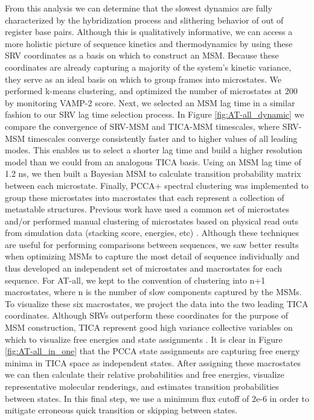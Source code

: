 \documentclass[journal=jpcbfk,manuscript=article]{achemso}
\begin{document}
From this analysis we can determine that the slowest dynamics are fully characterized by the hybridization process and slithering behavior of out of register base pairs. Although this is qualitatively informative, we can access a more holistic picture of sequence kinetics and thermodynamics by using these SRV coordinates as a basis on which to construct an MSM. Because these coordinates are already capturing a majority of the system's kinetic variance, they serve as an ideal basis on which to group frames into microstates. We performed k-means clustering, and optimized the number of microstates at 200 by monitoring VAMP-2 score. Next, we selected an MSM lag time in a similar fashion to our SRV lag time selection process. In Figure \ref{fig:AT-all_dynamic} we compare the convergence of SRV-MSM and TICA-MSM timescales, where SRV-MSM timescales converge consistently faster and to higher values of all leading modes. This enables us to select a shorter lag time and build a higher resolution model than we could from an analogous TICA basis. Using an MSM lag time of 1.2 ns, we then built a Bayesian MSM to calculate transition probability matrix between each microstate. Finally, PCCA+ spectral clustering was implemented to group these microstates into macrostates that each represent a collection of metastable structures. Previous work have used a common set of microstates and/or performed manual clustering of microstates based on physical read outs from simulation data (stacking score, energies, etc) \citep{Pinamonti2017PredictingModels, PinamontiTheModels}. Although these techniques are useful for performing comparisons between sequences, we saw better results when optimizing MSMs to capture the most detail of sequence individually and thus developed an independent set of microstates and macrostates for each sequence. For AT-all, we kept to the convention of clustering into n+1 macrostates, where n is the number of slow components captured by the MSMs. To visualize these six macrostates, we project the data into the two leading TICA coordinates. Although SRVs outperform these coordinates for the purpose of MSM construction, TICA represent good high variance collective variables on which to visualize free energies and state assignments \citep{Sidky}. It is clear in Figure \ref{fig:AT-all_in_one} that the PCCA state assignments are capturing free energy minima in TICA space as independent states. After assigning these macrostates we can then calculate their relative probabilities and free energies, visualize representative molecular renderings, and estimates transition probabilities between states. In this final step, we use a minimum flux cutoff of 2e-6 in order to mitigate erroneous quick transition or skipping between states. 
\end{document}
